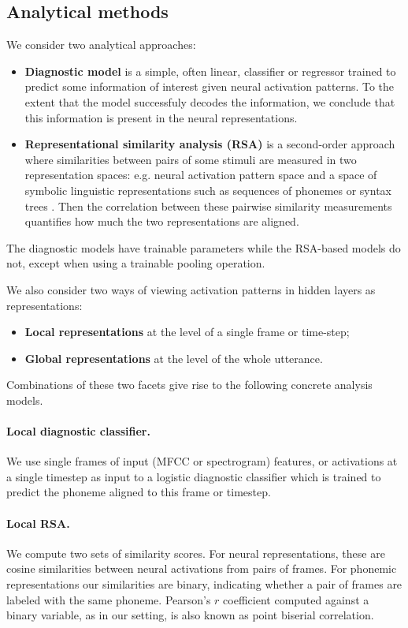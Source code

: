\subsection{Analytical methods}
\label{sec:analytical}
We consider two analytical approaches:

\begin{itemize}
\item {\bf Diagnostic model} is a simple, often linear, classifier or
regressor trained to predict some information of interest given neural
activation patterns. To the extent that the model successfuly decodes
the information, we conclude that this information is present in
the neural representations.
\item {\bf Representational similarity analysis (RSA)} is a second-order
approach where similarities between pairs of some stimuli are measured in
two representation spaces: e.g. neural activation pattern space and a space
of symbolic linguistic representations such as sequences of phonemes or syntax
trees \citep[see][]{chrupala-alishahi-2019-correlating}. Then the
correlation between these pairwise similarity measurements quantifies
how much the two representations are aligned.
\end{itemize}
The diagnostic models have trainable parameters while the
RSA-based models do not, except when using a trainable pooling
operation.

We also consider two ways of viewing activation patterns in hidden layers as
representations:
\begin{itemize}
\item {\bf Local representations} at the level of a single frame
or time-step;
\item {\bf Global representations} at the level of the whole
utterance.
\end{itemize}
Combinations of these two facets give rise to the following concrete analysis models.

\paragraph{Local diagnostic classifier.} We use single frames of input
(MFCC or spectrogram) features, or activations at a single timestep as input
to a logistic diagnostic classifier which is trained to predict the
phoneme aligned to this frame or timestep.

\paragraph{Local RSA.}
We compute two sets of similarity scores. For neural representations,
these are cosine similarities
between neural activations from pairs of frames. For phonemic
representations our similarities are binary, indicating whether a pair
of frames are labeled with the same phoneme. Pearson's $r$
coefficient computed against  a binary variable, as in our setting, is
also known as point biserial correlation.


